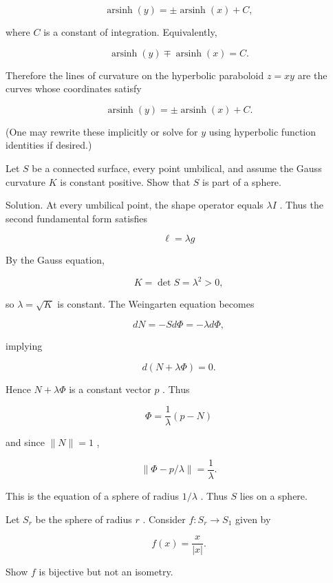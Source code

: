 \documentclass[10pt]{article}
\begin{document}
\[
\operatorname{arsinh}\left( y\right)  =  \pm  \operatorname{arsinh}\left( x\right)  + C,
\]

where \(C\) is a constant of integration. Equivalently,

\[
\operatorname{arsinh}\left( y\right)  \mp  \operatorname{arsinh}\left( x\right)  = C.
\]

Therefore the lines of curvature on the hyperbolic paraboloid \(z = {xy}\) are the curves whose coordinates satisfy

\[
\operatorname{arsinh}\left( y\right)  =  \pm  \operatorname{arsinh}\left( x\right)  + C.
\]

(One may rewrite these implicitly or solve for \(y\) using hyperbolic function identities if desired.)

\begin{problem}[title=PROBLEM 2 (4 POINTS)]
Let \(S\) be a connected surface, every point umbilical, and assume the Gauss curvature \(K\) is constant positive. Show that \(S\) is part of a sphere.
\end{problem}

Solution. At every umbilical point, the shape operator equals \({\lambda I}\) . Thus the second fundamental form satisfies

\[
\ell  = {\lambda g}
\]

By the Gauss equation,

\[
K = \det S = {\lambda }^{2} > 0,
\]

so \(\lambda  = \sqrt{K}\) is constant. The Weingarten equation becomes

\[
{dN} =  - {Sd\Phi } =  - {\lambda d\Phi },
\]

implying

\[
d\left( {N + {\lambda \Phi }}\right)  = 0.
\]

Hence \(N + {\lambda \Phi }\) is a constant vector \(p\) . Thus

\[
\Phi  = \frac{1}{\lambda }\left( {p - N}\right)
\]

and since \(\parallel N\parallel  = 1\) ,

\[
\parallel \Phi  - p/\lambda \parallel  = \frac{1}{\lambda }.
\]

This is the equation of a sphere of radius \(1/\lambda\) . Thus \(S\) lies on a sphere.

\begin{problem}[title=PROBLEM 3 (3 POINTS)]
Let \({S}_{r}\) be the sphere of radius \(r\) . Consider \(f : {S}_{r} \rightarrow  {S}_{1}\) given by

\[
f\left( x\right)  = \frac{x}{\left| x\right| }.
\]

Show \(f\) is bijective but not an isometry.
\end{problem}
\end{document}
